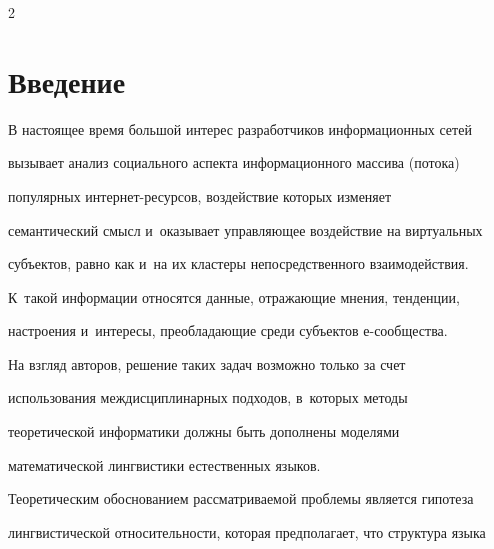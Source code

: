 










\thispagestyle{headings}



\begin{multicols}{2}



\label{st\stat}





\section{Введение}



  В настоящее время большой интерес разработчиков информационных сетей 

вызывает анализ социального аспекта информационного массива (потока) 

популярных ин\-тер\-нет-ре\-сур\-сов, воздействие которых изменяет 

семантический смысл и~оказывает управляющее воздействие на виртуальных 

субъектов, равно как и~на их кластеры непосредственного взаимодействия. 

К~такой информации относятся данные, отражающие мнения, тенденции, 

настроения и~интересы, преобладающие среди субъектов е-со\-об\-ще\-ства.

  

  На взгляд авторов, решение таких задач возможно только за счет 

использования междисциплинарных подходов, в~которых методы 

теоретической информатики должны быть дополнены моделями 

математической лингвистики естественных языков.

  

  Теоретическим обоснованием рассматриваемой проблемы является гипотеза 

лингвистической относительности, которая предполагает, что структура языка 


\end{multicols}
